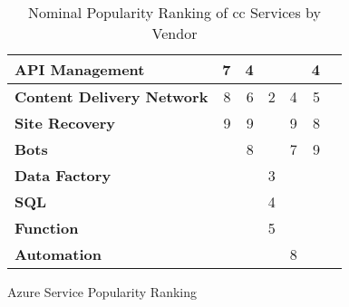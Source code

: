 \begin{table}[h!]
\begin{subtable}[t]{.4325\textwidth}
\begin{tabular}[t]{b{2 cm}rrrrrr}
			\textbf{API \newline Management}           & 7    & 4    &      &      & 4    \\ \midrule[0.25pt]
			\textbf{Content \newline Delivery Network} & 8    & 6    & 2    & 4    & 5    \\ \midrule[0.25pt]
			\textbf{Site \newline Recovery}            & 9    & 9    &      & 9    & 8    \\ \midrule[0.25pt]
			\textbf{Bots}                              &      & 8    &      & 7    & 9    \\ \midrule[0.25pt]
			\textbf{Data \newline Factory}             &      &      & 3    &      &      \\ \midrule[0.25pt]
			\textbf{SQL}                               &      &      & 4    &      &      \\ \midrule[0.25pt]
			\textbf{Function}                          &      &      & 5    &      &      \\ \midrule[0.25pt]
			\textbf{Automation}                        &      &      &      & 8    &      \\ \bottomrule
		\end{tabular}%
		\caption{Azure Service Popularity Ranking}
	\end{subtable}
	\caption{Nominal Popularity Ranking of \acs{cc} Services by Vendor}
	\label{tab:4-2-popularity}
\end{table}

